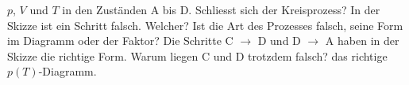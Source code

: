 \begin{abcliste}
\abc {} $p$, $V$ und $T$ in den Zuständen A bis D. Schliesst sich der Kreisprozess?
\abc In der Skizze ist ein Schritt falsch. Welcher? Ist die Art des Prozesses falsch, seine Form im Diagramm oder der Faktor?
\abc Die Schritte C $\to$ D und D $\to$ A haben in der Skizze die richtige Form. Warum liegen C und D trotzdem falsch?
\abc {} das richtige $p(T)$-Diagramm.
\end{abcliste}
